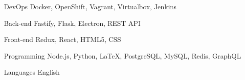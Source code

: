 

\begin{cvskills}

	\cvskill
	{DevOps} %
	{Docker, OpenShift, Vagrant, Virtualbox, Jenkins} %

	\cvskill
	{Back-end} %
	{Fastify, Flask, Electron, REST API} %

	\cvskill
	{Front-end} %
	{Redux, React, HTML5, CSS} %

	\cvskill
	{Programming} %
	{Node.js, Python, LaTeX, PostgreSQL, MySQL, Redis, GraphQL} %

	\cvskill
	{Languages} %
	{English} %

\end{cvskills}
